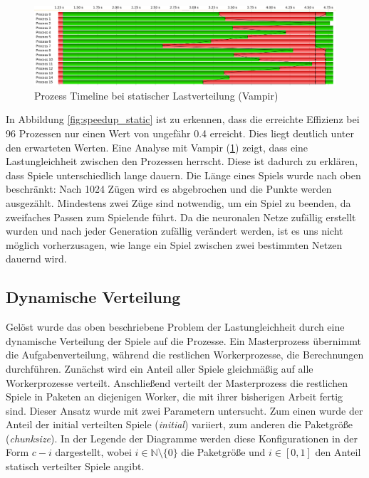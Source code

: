 \begin{figure}
    \centering
    \includegraphics[width=\textwidth]
        {content/img/vampir_static.png}
        \caption{Prozess Timeline bei statischer Lastverteilung (Vampir)}
    \label{fig:vampir_static}
\end{figure}

In Abbildung \ref{fig:speedup_static} ist zu erkennen, dass die erreichte
Effizienz bei 96 Prozessen nur einen Wert von ungefähr \num{0,4} erreicht.
Dies liegt deutlich unter den erwarteten Werten. Eine Analyse mit Vampir
(\ref{fig:vampir_static}) zeigt, dass eine Lastungleichheit zwischen den
Prozessen herrscht. Diese ist dadurch zu erklären, dass Spiele unterschiedlich
lange dauern. Die Länge eines Spiels wurde nach oben beschränkt: Nach 1024
Zügen wird es abgebrochen und die Punkte werden ausgezählt. Mindestens zwei
Züge sind notwendig, um ein Spiel zu beenden, da zweifaches Passen zum
Spielende führt.
Da die neuronalen Netze zufällig erstellt wurden und nach jeder Generation
zufällig verändert werden, ist es uns nicht möglich vorherzusagen, wie lange ein
Spiel zwischen zwei bestimmten Netzen dauernd wird.

\subsection{Dynamische Verteilung}

Gelöst wurde das oben beschriebene Problem der Lastungleichheit durch eine
dynamische Verteilung der Spiele auf die Prozesse.  Ein Masterprozess übernimmt
die Aufgabenverteilung, während die restlichen Workerprozesse, die Berechnungen
durchführen.  Zunächst wird ein Anteil aller Spiele gleichmäßig auf alle
Workerprozesse verteilt.  Anschließend verteilt der Masterprozess die
restlichen Spiele in Paketen an diejenigen Worker, die mit ihrer bisherigen
Arbeit fertig sind.  Dieser Ansatz wurde mit zwei Parametern untersucht. Zum
einen wurde der Anteil der initial verteilten Spiele (\emph{initial}) variiert,
zum anderen die Paketgröße (\emph{chunksize}). In der Legende der Diagramme
werden diese Konfigurationen in der Form $c-i$ dargestellt, wobei $i \in
\mathbb{N} \setminus \{0\}$ die Paketgröße und $i \in [0, 1]$ den Anteil
statisch verteilter Spiele angibt.

